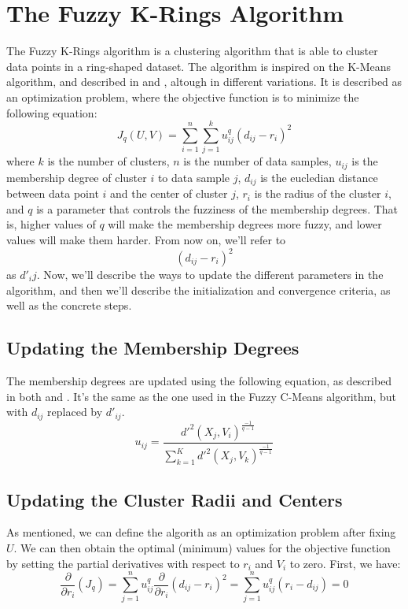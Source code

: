 \documentclass[conference]{IEEEtran}
\begin{document}
\section{The Fuzzy K-Rings Algorithm}
The Fuzzy K-Rings algorithm is a clustering algorithm that is able to cluster data points in a ring-shaped dataset.
The algorithm is inspired on the K-Means algorithm, and described in \cite{DAVE1992713} and \cite{308484}, altough in different variations.
It is described as an optimization problem, where the objective function is to minimize the following equation:
\begin{equation}\label{eq:objective}
J_q(U, V) = \sum_{i=1}^{n} \sum_{j=1}^{k} u_{ij}^q (d_{ij} - r_i)^2
\end{equation}
where $k$ is the number of clusters, $n$ is the number of data samples, $u_{ij}$ is the membership degree of cluster $i$ to data sample $j$, $d_{ij}$ is the eucledian distance between data point $i$ and the center of cluster $j$, $r_i$ is the radius of the cluster $i$, and $q$ is a parameter that controls the fuzziness of the membership degrees.
That is, higher values of $q$ will make the membership degrees more fuzzy, and lower values will make them harder.
From now on, we'll refer to $$(d_{ij} - r_i)^2$$ as $d'_ij$.
Now, we'll describe the ways to update the different parameters in the algorithm, and then we'll describe the initialization and convergence criteria, as well as the concrete steps.

\subsection{Updating the Membership Degrees}
The membership degrees are updated using the following equation, as described in both \cite{DAVE1992713} and \cite{308484}. It's the same as the one used in the Fuzzy C-Means algorithm, but with $d_{ij}$ replaced by $d'_{ij}$.
\begin{equation}
u_{ij} = \frac{d'^2(X_j, V_i)^{\frac{-1}{q-1}}}{\sum_{k=1}^{K} d'^2(X_j, V_k)^{\frac{-1}{q-1}}}
\end{equation}

\subsection{Updating the Cluster Radii and Centers}
As mentioned, we can define the algorith as an optimization problem after fixing $U$. We can then obtain the optimal (minimum) values for the objective function
by setting the partial derivatives with respect to $r_i$ and $V_i$ to zero.
First, we have:
\begin{equation}\label{eq:d_dr}
\frac{\partial}{\partial r_i}(J_q) = \sum_{j=1}^{n} u_{ij}^q\frac{\partial}{\partial r_i} (d_{ij} - r_i)^2 = \sum_{j=1}^{n} u_{ij}^q (r_i - d_{ij}) = 0
\end{equation}
\end{document}
